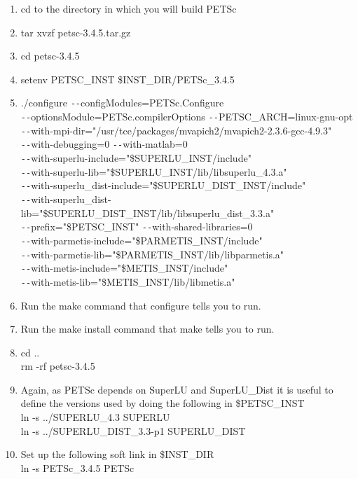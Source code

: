 \documentclass[11pt]{amsart}
\begin{document}
\begin{enumerate}
\item cd to the directory in which you will build PETSc
\item tar xvzf petsc-3.4.5.tar.gz
\item cd petsc-3.4.5
\item setenv PETSC\_INST \$INST\_DIR/PETSc\_3.4.5
\item ./configure \texttt{-{}-}configModules=PETSc.Configure \\
\texttt{-{}-}optionsModule=PETSc.compilerOptions
\texttt{-{}-}PETSC\_ARCH=linux-gnu-opt \\
\texttt{-{}-}with-mpi-dir="/usr/tce/packages/mvapich2/mvapich2-2.3.6-gcc-4.9.3" \\
\texttt{-{}-}with-debugging=0 \texttt{-{}-}with-matlab=0 \\
\texttt{-{}-}with-superlu-include="\$SUPERLU\_INST/include" \\
\texttt{-{}-}with-superlu-lib="\$SUPERLU\_INST/lib/libsuperlu\_4.3.a" \\
\texttt{-{}-}with-superlu\_dist-include="\$SUPERLU\_DIST\_INST/include" \\
\texttt{-{}-}with-superlu\_dist-lib="\$SUPERLU\_DIST\_INST/lib/libsuperlu\_dist\_3.3.a" \\
\texttt{-{}-}prefix="\$PETSC\_INST" \texttt{-{}-}with-shared-libraries=0 \\
\texttt{-{}-}with-parmetis-include="\$PARMETIS\_INST/include" \\
\texttt{-{}-}with-parmetis-lib="\$PARMETIS\_INST/lib/libparmetis.a" \\
\texttt{-{}-}with-metis-include="\$METIS\_INST/include" \\
\texttt{-{}-}with-metis-lib="\$METIS\_INST/lib/libmetis.a"
\item Run the make command that configure tells you to run.
\item Run the make install command that make tells you to run.
\item cd .. \\
rm -rf petsc-3.4.5
\item Again, as PETSc depends on SuperLU and SuperLU\_Dist it is useful to
define the versions used by doing the following in \$PETSC\_INST \\
ln -s ../SUPERLU\_4.3 SUPERLU \\
ln -s ../SUPERLU\_DIST\_3.3-p1 SUPERLU\_DIST
\item Set up the following soft link in \$INST\_DIR \\
ln -s PETSc\_3.4.5 PETSc
\end{enumerate}
\end{document}
